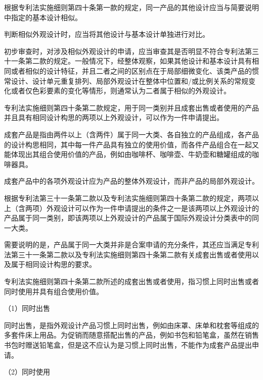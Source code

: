 根据专利法实施细则第四十条第一款的规定，同一产品的其他设计应当与简要说明中指定的基本设计相似。

判断相似外观设计时，应当将其他设计与基本设计单独进行对比。

初步审查时，对涉及相似外观设计的申请，应当审查其是否明显不符合专利法第三十一条第二款的规定。一般情况下，经整体观察，如果其他设计和基本设计具有相同或者相似的设计特征，并且二者之间的区别点在于局部细微变化、该类产品的惯常设计、设计单元重复排列、局部外观设计在整体中位置和/或比例关系的常规变化或者仅色彩要素的变化等情形，则通常认为二者属于相似的外观设计。

专利法实施细则第四十条第二款规定，用于同一类别并且成套出售或者使用的产品并且具有相同设计构思的两项以上外观设计，可以作为一件申请提出。

成套产品是指由两件以上（含两件）属于同一大类、各自独立的产品组成，各产品的设计构思相同，其中每一件产品具有独立的使用价值，而各件产品组合在一起又能体现出其组合使用价值的产品，例如由咖啡杯、咖啡壶、牛奶壶和糖罐组成的咖啡器具。

成套产品中的各项外观设计应为产品的整体外观设计，而非产品的局部外观设计。

根据专利法第三十一条第二款以及专利法实施细则第四十条第二款的规定，两项以上（含两项）外观设计可以作为一件申请提出的条件之一是该两项以上外观设计的产品属于同一类别，即该两项以上外观设计的产品属于国际外观设计分类表中的同一大类。

需要说明的是，产品属于同一大类并非是合案申请的充分条件，其还应当满足专利法第三十一条第二款以及专利法实施细则第四十条第二款有关成套出售或者使用以及属于相同设计构思的要求。

专利法实施细则第四十条第二款所述的成套出售或者使用，指习惯上同时出售或者同时使用并具有组合使用价值。

{\setlength{\parindent}{17.1bp}（1）同时出售\par}

同时出售，是指外观设计产品习惯上同时出售，例如由床罩、床单和枕套等组成的多套件床上用品。为促销而随意搭配出售的产品，例如书包和铅笔盒，虽然在销售书包时赠送铅笔盒，但是这不应认为是习惯上同时出售，不能作为成套产品提出申请。

{\setlength{\parindent}{17.1bp}（2）同时使用\par}

